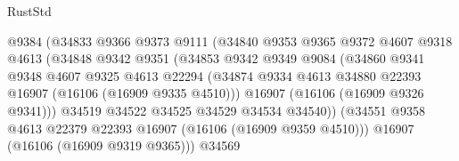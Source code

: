 \begin{lexlean}{RustStd}
\begin{coremodule}
                                    @9384
                                    (@34833
                                      @9366
                                      @9373
                                      @9111
                                      (@34840
                                        @9353
                                        @9365
                                        @9372
                                        @4607
                                        @9318
                                        @4613
                                        (@34848
                                          @9342
                                          @9351
                                          (@34853
                                            @9342
                                            @9349
                                            @9084
                                            (@34860
                                              @9341
                                              @9348
                                              @4607
                                              @9325
                                              @4613
                                              @22294
                                              (@34874
                                                @9334
                                                @4613
                                                @34880
                                                @22393
                                                @16907
                                                (@16106 (@16909 @9335 @4510)))
                                              @16907
                                              (@16106 (@16909 @9326 @9341)))
                                            @34519
                                            @34522
                                            @34525
                                            @34529
                                            @34534
                                            @34540))
                                        (@34551
                                          @9358
                                          @4613
                                          @22379
                                          @22393
                                          @16907
                                          (@16106 (@16909 @9359 @4510)))
                                        @16907
                                        (@16106 (@16909 @9319 @9365)))
                                      @34569

\end{coremodule}
\end{lexlean}
